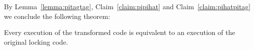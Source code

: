 By Lemma~\ref{lemma:pitagtag}, Claim~\ref{claim:pipihat} and Claim~\ref{claim:pihatpitag} we conclude the following
theorem:
\begin{theorem}
Every execution of the transformed code is equivalent to an
execution of the original locking code.
\end{theorem}
